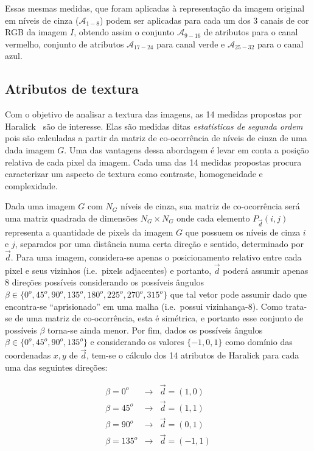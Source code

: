 Essas mesmas medidas, que foram aplicadas à representação da imagem
original em níveis de cinza ($\mathcal{A}_{1-8}$) podem ser aplicadas
para cada um dos 3 canais de cor RGB da imagem $I$, obtendo assim o
conjunto $\mathcal{A}_{9-16}$ de atributos para o canal vermelho,
conjunto de atributos $\mathcal{A}_{17-24}$ para canal verde e
$\mathcal{A}_{25-32}$ para o canal azul.

\subsection{Atributos de textura}

Com o objetivo de analisar a textura das imagens, as 14 medidas
propostas por Haralick~\cite{haralick} são de interesse. Elas são
medidas ditas \emph{estatísticas de segunda ordem} pois são calculadas
a partir da matriz de co-ocorrência de níveis de cinza de uma dada
imagem $G$. Uma das vantagens dessa abordagem é levar em conta a
posição relativa de cada pixel da imagem. Cada uma das 14 medidas
propostas procura caracterizar um aspecto de textura como contraste,
homogeneidade e complexidade.

Dada uma imagem $G$ com $N_G$ níveis de cinza, sua matriz de co-ocorrência será
uma matriz quadrada de dimensões $N_G \times N_G$ onde cada elemento $P_{\vec{d}}(i,j)$ representa
a quantidade de pixels da imagem $G$ que possuem os níveis de cinza $i$ e $j$,
separados por uma distância numa certa direção e sentido, determinado por
$\vec{d}$. Para uma imagem, considera-se apenas o posicionamento relativo entre
cada pixel e seus vizinhos (i.e.\ pixels adjacentes) e portanto, $\vec{d}$
poderá assumir apenas 8 direções possíveis considerando os possíveis ângulos
$\beta \in \{0^o, 45^o, 90^o, 135^o, 180^o, 225^o, 270^o, 315^o\}$ que tal
vetor pode assumir dado que encontra-se ``aprisionado'' em uma malha
(i.e.\ possui vizinhança-8). Como
trata-se de uma matriz de co-ocorrência, esta é simétrica, e portanto esse
conjunto de possíveis $\beta$ torna-se ainda menor. Por fim, dados os possíveis
ângulos $\beta \in \{0^o, 45^o, 90^o, 135^o\}$ e considerando os valores $\{-1,
0, 1\}$ como domínio das coordenadas $x,y$ de $\vec{d}$, tem-se o cálculo dos 14
atributos de Haralick para cada uma das seguintes direções:

\begin{eqnarray}
  \beta = 0^o & \to & \vec{d} = (1, 0) \\
  \beta = 45^o & \to & \vec{d} = (1, 1) \\
  \beta = 90^o & \to & \vec{d} = (0, 1) \\
  \beta = 135^o & \to & \vec{d} = (-1, 1)
\end{eqnarray}

